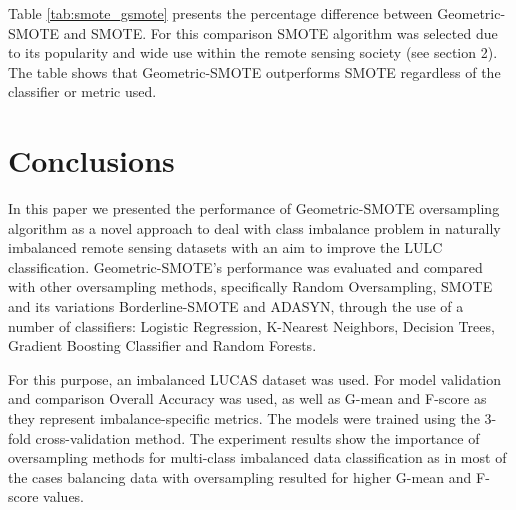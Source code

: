 \documentclass[parskip=full]{scrartcl}
\begin{document}

Table \ref{tab:smote_gsmote} presents the percentage difference  between
Geometric-SMOTE and SMOTE. For this comparison SMOTE algorithm was selected due
to its popularity and wide use within the remote sensing society (see section
2). The table shows that Geometric-SMOTE outperforms SMOTE regardless of the
classifier or metric used.


\section{Conclusions}

In this paper we presented the performance of Geometric-SMOTE oversampling
algorithm as a novel approach to deal with class imbalance problem in naturally
imbalanced remote sensing datasets  with an aim to improve the LULC
classification. Geometric-SMOTE's performance was evaluated and compared with
other oversampling methods, specifically Random Oversampling, SMOTE and its
variations Borderline-SMOTE and ADASYN, through the use of a number of
classifiers: Logistic Regression, K-Nearest Neighbors, Decision Trees, Gradient
Boosting Classifier and Random Forests.

For this purpose, an imbalanced LUCAS dataset was used. For model validation and
comparison Overall Accuracy was used, as well as G-mean and F-score as they
represent imbalance-specific metrics. The models were trained using the 3-fold
cross-validation method. The experiment results show the importance of
oversampling methods for multi-class imbalanced data classification as in most
of the cases balancing data with oversampling resulted for higher G-mean and F-
score values.
\end{document}

